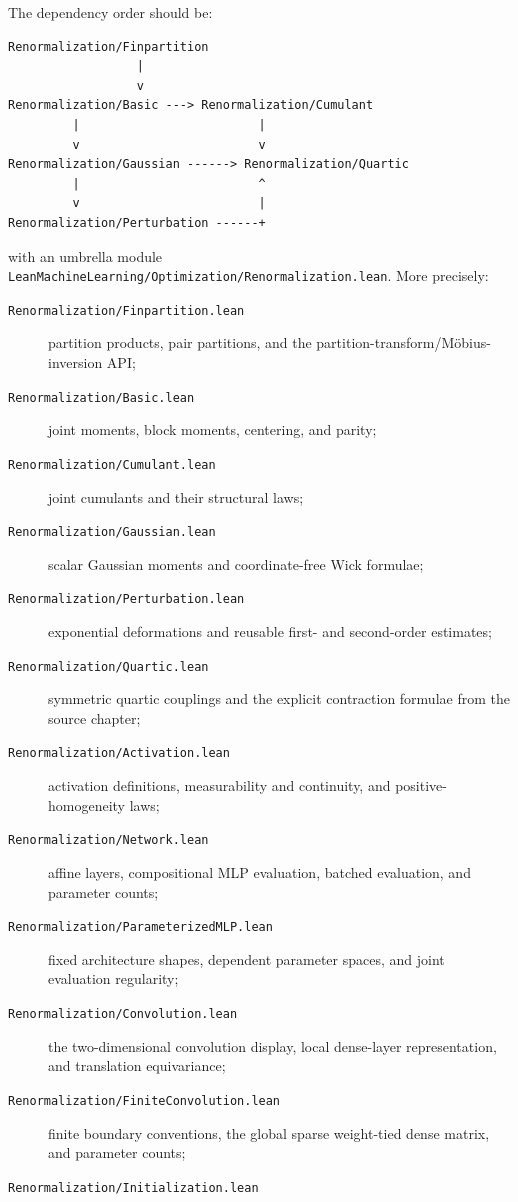 The dependency order should be:
\begin{verbatim}
Renormalization/Finpartition
                  |
                  v
Renormalization/Basic ---> Renormalization/Cumulant
         |                         |
         v                         v
Renormalization/Gaussian ------> Renormalization/Quartic
         |                         ^
         v                         |
Renormalization/Perturbation ------+
\end{verbatim}
with an umbrella module
\texttt{LeanMachineLearning/Optimization/Renormalization.lean}.  More precisely:
\begin{description}
  \item[\texttt{Renormalization/Finpartition.lean}]
    partition products, pair partitions, and the partition-transform/M\"obius-inversion API;
  \item[\texttt{Renormalization/Basic.lean}]
    joint moments, block moments, centering, and parity;
  \item[\texttt{Renormalization/Cumulant.lean}]
    joint cumulants and their structural laws;
  \item[\texttt{Renormalization/Gaussian.lean}]
    scalar Gaussian moments and coordinate-free Wick formulae;
  \item[\texttt{Renormalization/Perturbation.lean}]
    exponential deformations and reusable first- and second-order estimates;
  \item[\texttt{Renormalization/Quartic.lean}]
    symmetric quartic couplings and the explicit contraction formulae from the source chapter;
  \item[\texttt{Renormalization/Activation.lean}]
    activation definitions, measurability and continuity, and positive-homogeneity laws;
  \item[\texttt{Renormalization/Network.lean}]
    affine layers, compositional MLP evaluation, batched evaluation, and parameter counts;
  \item[\texttt{Renormalization/ParameterizedMLP.lean}]
    fixed architecture shapes, dependent parameter spaces, and joint evaluation regularity;
  \item[\texttt{Renormalization/Convolution.lean}]
    the two-dimensional convolution display, local dense-layer representation, and translation
    equivariance;
  \item[\texttt{Renormalization/FiniteConvolution.lean}]
    finite boundary conventions, the global sparse weight-tied dense matrix, and parameter counts;
  \item[\texttt{Renormalization/Initialization.lean}]

\end{description}

